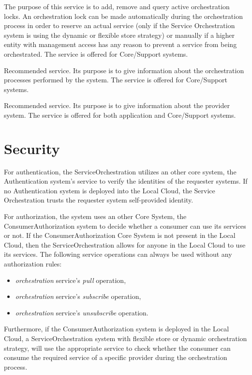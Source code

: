 \documentclass[a4paper]{arrowhead}
\begin{document}
The purpose of this service is to add, remove and query active orchestration locks. An orchestration lock can be made automatically during the orchestration process in order to reserve an actual service (only if the Service Orchestration system is using the dynamic or flexible store strategy) or manually if a higher entity with management access has any reason to prevent a service from being orchestrated. The service is offered for Core/Support systems.

Recommended service. Its purpose is to give information about the orchestration processes performed by the system. The service is offered for Core/Support systems.

Recommended service. Its purpose is to give information about the provider system. The service is offered for both application and Core/Support systems. 

\newpage

\section{Security}
\label{sec:security}

For authentication, the ServiceOrchestration utilizes an other core system, the Authentication system's service to verify the identities of the requester systems. If no Authentication system is deployed into the Local Cloud, the Service Orchestration trusts the requester system self-provided identity.

For authorization, the system uses an other Core System, the ConsumerAuthorization system to decide whether a consumer can use its services or not. If the ConsumerAuthorization Core System is not present in the Local Cloud, then the ServiceOrchestration allows for anyone in the Local Cloud to use its services. The following service operations can always be used without any authorization rules:

\begin{itemize}
    \item \textit{orchestration} service's \textit{pull} operation,
    \item \textit{orchestration} service's \textit{subscribe} operation,
    \item \textit{orchestration} service's \textit{unsubscribe} operation.
\end{itemize}

Furthermore, if the ConsumerAuthorization system is deployed in the Local Cloud, a ServiceOrchestration system with flexible store or dynamic orchestration strategy, will use the appropriate service to check whether the consumer can consume the required service of a specific provider during the orchestration process.
\end{document}
